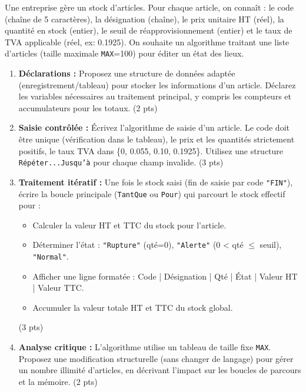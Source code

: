 \documentclass[11pt]{article}
\begin{document}
\begin{exercice}
Une entreprise gère un stock d'articles. Pour chaque article, on connaît : le code (chaîne de 5 caractères), la désignation (chaîne), le prix unitaire HT (réel), la quantité en stock (entier), le seuil de réapprovisionnement (entier) et le taux de TVA applicable (réel, ex: 0.1925). On souhaite un algorithme traitant une liste d'articles (taille maximale \texttt{MAX}=100) pour éditer un état des lieux.

\begin{enumerate}
    \item \textbf{Déclarations :} Proposez une structure de données adaptée (enregistrement/tableau) pour stocker les informations d'un article. Déclarez les variables nécessaires au traitement principal, y compris les compteurs et accumulateurs pour les totaux. (2 pts)
    \item \textbf{Saisie contrôlée :} Écrivez l'algorithme de saisie d'un article. Le code doit être unique (vérification dans le tableau), le prix et les quantités strictement positifs, le taux TVA dans \{0, 0.055, 0.10, 0.1925\}. Utilisez une structure \texttt{Répéter...Jusqu'à} pour chaque champ invalide. (3 pts)
    \item \textbf{Traitement itératif :} Une fois le stock saisi (fin de saisie par code \texttt{"FIN"}), écrire la boucle principale (\texttt{TantQue} ou \texttt{Pour}) qui parcourt le stock effectif pour :
    \begin{itemize}
        \item Calculer la valeur HT et TTC du stock pour l'article.
        \item Déterminer l'état : \texttt{"Rupture"} (qté=0), \texttt{"Alerte"} (0 < qté $\le$ seuil), \texttt{"Normal"}.
        \item Afficher une ligne formatée : Code | Désignation | Qté | État | Valeur HT | Valeur TTC.
        \item Accumuler la valeur totale HT et TTC du stock global.
    \end{itemize}
    (3 pts)
    \item \textbf{Analyse critique :} L'algorithme utilise un tableau de taille fixe \texttt{MAX}. Proposez une modification structurelle (sans changer de langage) pour gérer un nombre illimité d'articles, en décrivant l'impact sur les boucles de parcours et la mémoire. (2 pts)
\end{enumerate}
\end{exercice}
\end{document}
